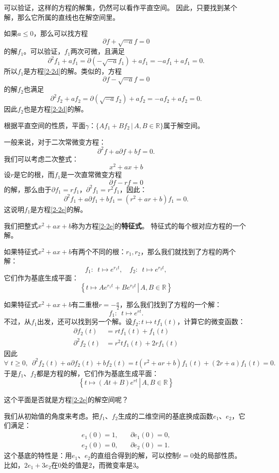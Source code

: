 \documentclass[12pt,UTF8]{ctexbook}
\theoremstyle{definition}
\theoremstyle{plain}
\begin{document}
可以验证，这样的方程的解集，仍然可以看作平直空间。
因此，只要找到某个解，那么它所属的直线也在解空间里。

如果$a\leqslant 0$，那么可以找方程
$$ \partial f + \sqrt{-a} f = 0 $$
的解$f_1$。可以验证，$f_1$两次可微，且满足
$$ \partial^2 f_1 + a f_1 = \partial (- \sqrt{-a} f_1) + af_1 = -af_1 + af_1 = 0. $$
所以$f_1$是方程\eqref{2-2d}的解。类似的，方程
$$ \partial f - \sqrt{-a} f = 0 $$
的解$f_2$也满足
$$ \partial^2 f_2 + a f_2 = \partial (\sqrt{-a} f_2) + af_2 = -af_2 + af_2 = 0. $$
因此$f_2$也是方程\eqref{2-2d}的解。

根据平直空间的性质，平面$\gamma$：$\{Af_1 + Bf_2 \, | \, A, B\in\mathbb{R}\}$属于解空间。

一般来说，对于二次常微变方程：
\begin{equation}
    \partial^2 f + a \partial f + b f = 0. \label{2-2e}
\end{equation}
我们可以考虑二次整式：
$$ x^2 + ax + b$$
设$r$是它的根，而$f_1$是一次直常微变方程
$$ \partial f - r f = 0 $$
的解，那么由于$\partial f_1 = rf_1 $，$\partial^2 f_1 = r^2f_1 $，因此：
$$ \partial^2 f_1 + a \partial f_1 + b f_1 = (r^2 + ar + b)f_1 = 0.$$
这说明$f_1$是方程\eqref{2-2e}的解。

我们把整式$ x^2 + ax + b$称为方程\eqref{2-2e}的\textbf{特征式}。
特征式的每个根对应方程的一个解。

如果特征式$x^2 + ax + b$有两个不同的根：$r_1, r_2$，那么我们就找到了方程的两个解：
$$ f_1:\,\,\, t \mapsto e^{r_1t}, \quad f_2:\,\,\, t \mapsto e^{r_2t}, $$
它们作为基底生成平面：
$$ \left\{\left.t \mapsto Ae^{r_1t} + Be^{r_2t}\,\right|\, A, B \in \mathbb{R}\right\}$$

如果特征式$x^2 + ax + b$有二重根$r = -\frac{a}{2}$，那么我们找到了方程的一个解：
$$ f_1:\,\,\, t \mapsto e^{rt}. $$
不过，从$f_1$出发，还可以找到另一个解。设$f_2: t\mapsto tf_1(t)$，计算它的微变函数：
\begin{align*}
    \partial f_2(t) &= rt f_1(t) + f_1(t) \\
    \partial^2 f_2(t) &= r^2 t f_1(t) + 2r f_1(t)
\end{align*}
因此
$$ \forall\,\, t \geqslant 0,\,\,\,\partial^2 f_2(t) + a \partial f_2(t) + b f_2(t) = t(r^2 + ar + b)f_1(t) + (2r + a)f_1(t) = 0.$$
于是$f_1$、$f_2$都是方程的解，它们作为基底生成平面：
$$ \left\{\left.t \mapsto (At + B)e^{rt}\,\right|\, A, B \in \mathbb{R}\right\}$$

这个平面是否就是方程\eqref{2-2e}的解空间呢？

我们从初始值的角度来考虑。把$f_1$、$f_2$生成的二维空间的基底换成函数$e_1$、$e_2$，它们满足：
$$
\begin{array}{ll}
    e_1(0) = 1, &\quad \partial e_1(0) = 0, \\
    e_2(0) = 0, &\quad \partial e_2(0) = 1.
\end{array}
$$
这个基底的特性是：用$e_1$、$e_2$的直组合得到的解，可以控制$t = 0$处的局部性质。
比如，$2e_1 + 3e_2$在$0$处的值是$2$，而微变率是$3$。
\end{document}
